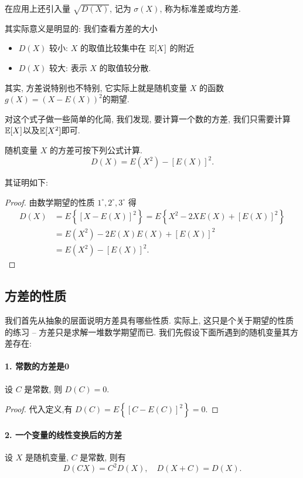 在应用上还引入量 $\sqrt{D(X)}$, 记为 $\sigma(X)$, 称为标准差或均方差.

其实际意义是明显的: 我们查看方差的大小
\begin{itemize}
    \item $D(X)$ 较小:  $X$ 的取值比较集中在 $\mathbb E[X] $ 的附近
    \item $D(X)$ 较大: 表示 $X$ 的取值较分散.
\end{itemize}

其实, 方差说特别也不特别, 它实际上就是随机变量 $X$ 的函数 $g(X)=(X-E(X))^2$的期望. 

对这个式子做一些简单的化简, 我们发现, 要计算一个数的方差, 我们只需要计算$\mathbb E[X]$以及$\mathbb E[X^2]$即可. 

   \begin{proposition}
       随机变量 $X$ 的方差可按下列公式计算.
   $$
   D(X)=E\left(X^2\right)-[E(X)]^2 .
   $$
   \end{proposition}
   
   其证明如下: 
   \begin{proof}
       由数学期望的性质 $1^{\circ}, 2^{\circ}, 3^{\circ}$ 得
   $$
   \begin{aligned}
   D(X) & =E\left\{[X-E(X)]^2\right\}=E\left\{X^2-2 X E(X)+[E(X)]^2\right\} \\
   & =E\left(X^2\right)-2 E(X) E(X)+[E(X)]^2 \\
   & =E\left(X^2\right)-[E(X)]^2 .
   \end{aligned}
   $$
      \end{proof}




   \subsection{方差的性质}

   我们首先从抽象的层面说明方差具有哪些性质. 实际上, 这只是个关于期望的性质的练习 -- 方差只是求解一堆数学期望而已. 我们先假设下面所遇到的随机变量其方差存在: 

   \paragraph{1. 常数的方差是0} 设 $C$ 是常数, 则 $D(C)=0$.
   \begin{proof}
    代入定义,有 $D(C)=E\left\{[C-E(C)]^2\right\}=0$.
   \end{proof}


   \paragraph{2. 一个变量的线性变换后的方差} 设 $X$ 是随机变量, $C$ 是常数, 则有
   $$
   D(C X)=C^2 D(X), \quad D(X+C)=D(X) .
   $$

